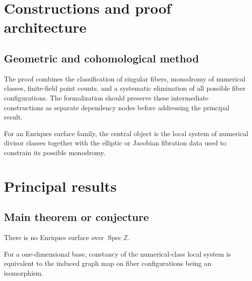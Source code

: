\chapter{Constructions and proof architecture}
\label{chap:no-enriques-surface-over-the-integers-method}

\section{Geometric and cohomological method}
\label{sec:no-enriques-surface-over-the-integers-method}

The proof combines the classification of singular fibers, monodromy of numerical classes, finite-field point counts, and a systematic elimination of all possible fiber configurations. The formalization should preserve these intermediate constructions
as separate dependency nodes before addressing the principal result.

\begin{definition}
\label{no-enriques-surface-over-the-integers-central-object}
For an Enriques surface family, the central object is the local system of numerical divisor classes together with the elliptic or Jacobian fibration data used to constrain its possible monodromy.
\notready
\end{definition}

\chapter{Principal results}
\label{chap:no-enriques-surface-over-the-integers-results}

\section{Main theorem or conjecture}
\label{sec:no-enriques-surface-over-the-integers-results}

\begin{theorem}
\label{no-enriques-surface-over-the-integers-main}
There is no Enriques surface over $\operatorname{Spec}\mathbb Z$.
\notready
\end{theorem}

\begin{proposition}
\label{no-enriques-surface-over-the-integers-secondary}
For a one-dimensional base, constancy of the numerical-class local system is equivalent to the induced graph map on fiber configurations being an isomorphism.
\notready
\end{proposition}
